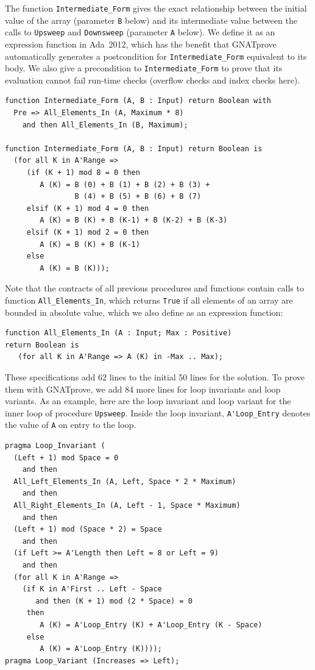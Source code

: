 \documentclass[sttt,final]{svjour}
\newcommand{\gnatprove}{GNATprove\xspace}
\newcommand{\adatwtw}{Ada~2012\xspace}
\begin{document}
The function \verb|Intermediate_Form| gives the exact relationship between the
initial value of the array (parameter \verb|B| below) and its intermediate
value between the calls to \verb|Upsweep| and \verb|Downsweep| (parameter
\verb|A| below). We define it as an expression function in \adatwtw, which has
the benefit that \gnatprove automatically generates a postcondition for
\verb|Intermediate_Form| equivalent to its body. We also give a precondition to
\verb|Intermediate_Form| to prove that its evaluation cannot fail run-time
checks (overflow checks and index checks here).

\begin{lstlisting}
function Intermediate_Form (A, B : Input) return Boolean with
  Pre => All_Elements_In (A, Maximum * 8)
    and then All_Elements_In (B, Maximum);

function Intermediate_Form (A, B : Input) return Boolean is
  (for all K in A'Range =>
     (if (K + 1) mod 8 = 0 then
        A (K) = B (0) + B (1) + B (2) + B (3) +
                B (4) + B (5) + B (6) + B (7)
     elsif (K + 1) mod 4 = 0 then
        A (K) = B (K) + B (K-1) + B (K-2) + B (K-3)
     elsif (K + 1) mod 2 = 0 then
        A (K) = B (K) + B (K-1)
     else
        A (K) = B (K)));
\end{lstlisting}

Note that the contracts of all previous procedures and functions contain calls
to function \verb|All_Elements_In|, which returns \verb|True| if all elements
of an array are bounded in absolute value, which we also define as an
expression function:

\begin{lstlisting}
function All_Elements_In (A : Input; Max : Positive)
return Boolean is
   (for all K in A'Range => A (K) in -Max .. Max);
\end{lstlisting}

These specifications add 62 lines to the initial 50 lines for the solution. To
prove them with \gnatprove, we add 84 more lines for loop invariants and loop
variants. As an example, here are the loop invariant and loop variant for the
inner loop of procedure \verb|Upsweep|. Inside the loop invariant,
\verb|A'Loop_Entry| denotes the value of \verb|A| on entry to the loop.

\begin{lstlisting}
pragma Loop_Invariant (
  (Left + 1) mod Space = 0
    and then
  All_Left_Elements_In (A, Left, Space * 2 * Maximum)
    and then
  All_Right_Elements_In (A, Left - 1, Space * Maximum)
    and then
  (Left + 1) mod (Space * 2) = Space
    and then
  (if Left >= A'Length then Left = 8 or Left = 9)
    and then
  (for all K in A'Range =>
    (if K in A'First .. Left - Space
       and then (K + 1) mod (2 * Space) = 0
     then
        A (K) = A'Loop_Entry (K) + A'Loop_Entry (K - Space)
     else
        A (K) = A'Loop_Entry (K))));
pragma Loop_Variant (Increases => Left);
\end{lstlisting}
\end{document}

